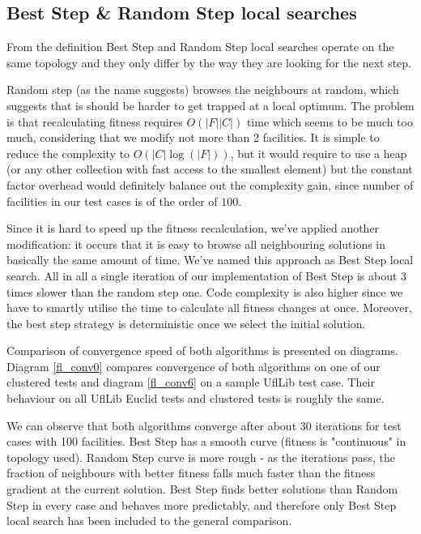 \subsection{Best Step \& Random Step local searches}

From the definition
Best Step and Random Step local searches operate on the same topology and
they only differ by the way they are looking for the next step.

Random step (as the name suggests) browses the neighbours at random,
which suggests that is should be harder to get trapped at a local optimum.
The problem is that recalculating fitness requires $O(|F||C|)$ time which
seems to be much too much, considering that we modify not more than 2 
facilities. It is simple to reduce the complexity to $O(|C|\log(|F|))$,
but it would require to use a heap (or any other collection with fast access
to the smallest element) but the constant factor overhead would definitely
balance out the complexity gain, since number of facilities in our test
cases is of the order of $100$.

Since it is hard to speed up the fitness recalculation, we've applied
another modification: it occurs that it is easy to browse all neighbouring
solutions in basically the same amount of time. We've named this approach
as Best Step local search. All in all a single iteration of our implementation
of Best Step is about 3 times slower than the random step one.
Code complexity is also higher since we have to smartly utilise the
time to calculate all fitness changes at once.
Moreover, the best step strategy is deterministic once we select the initial
solution.

Comparison of convergence speed of both algorithms is presented on diagrams.
Diagram \ref{fl_conv0} compares convergence of both algorithms on one of our clustered tests
and diagram \ref{fl_conv6} on a sample UflLib test case. Their behaviour on all UflLib Euclid
tests and clustered tests is roughly the same.

We can observe that both algorithms converge after about 30 iterations for test cases with
100 facilities. Best Step has a smooth curve (fitness is "continuous" in topology used).
Random Step curve is more rough - as the iterations pass, the fraction of neighbours with better fitness
falls much faster than the fitness gradient at the current solution.
Best Step finds better solutions than Random Step in every case and behaves more predictably,
and therefore only Best Step local search has been included to the general comparison.

